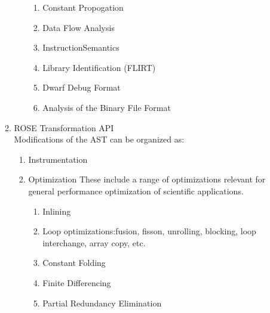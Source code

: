 \begin{enumerate}
\begin{enumerate}
\begin{enumerate}
\begin{enumerate}
               \item Constant Propogation
               \item Data Flow Analysis
               \item InstructionSemantics
               \item Library Identification (FLIRT)
               \item Dwarf Debug Format
               \item Analysis of the Binary File Format
            \end{enumerate}
         \end{enumerate}

      \item ROSE Transformation API \\
         Modifications of the AST can be organized as:
         \begin{enumerate}
            \item Instrumentation
            \item Optimization
               These include a range of optimizations relevant for general performance
               optimization of scientific applications.
            \begin{enumerate}
               \item Inlining
               \item Loop optimizations:fusion, fisson, unrolling, blocking, loop
                  interchange, array copy, etc.
               \item Constant Folding
               \item Finite Differencing
               \item Partial Redundancy Elimination
            \end{enumerate}


\end{enumerate}
\end{enumerate}
\end{enumerate}
